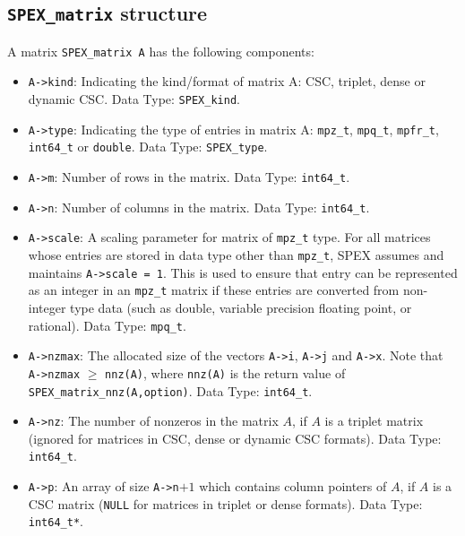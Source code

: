 \documentclass[12pt,oneside]{book}
\theoremstyle{definition}
\begin{document}
\subsection{\texttt{SPEX\_matrix} structure}
A matrix \verb|SPEX_matrix A| has the following components:

\begin{itemize}
    \item \verb|A->kind|: Indicating the kind/format of matrix A: CSC, triplet, dense or dynamic CSC. Data Type: \verb|SPEX_kind|.

    \item \verb|A->type|: Indicating the type of entries in matrix A: \verb|mpz_t|, \verb|mpq_t|, \verb|mpfr_t|, \verb|int64_t| or \verb|double|. Data Type: \verb|SPEX_type|.

    \item \verb|A->m|: Number of rows in the matrix. Data Type: \verb|int64_t|.

    \item \verb|A->n|: Number of columns in the matrix. Data Type: \verb|int64_t|.

    \item \verb|A->scale|: A scaling parameter for matrix of \verb|mpz_t| type. For all matrices whose entries are stored in data type other than \verb|mpz_t|, SPEX assumes and maintains \verb|A->scale = 1|. This is used to ensure that entry can be represented as an integer in an \verb|mpz_t| matrix if these entries are converted from non-integer type data (such as double, variable precision floating point, or rational). Data Type: \verb|mpq_t|.

    \item \verb|A->nzmax|: The allocated size of the vectors \verb|A->i|, \verb|A->j| and \verb|A->x|. Note that \verb|A->nzmax| $\geq$ \verb|nnz(A)|, where \verb|nnz(A)| is the return value of \verb|SPEX_matrix_nnz(A,option)|. Data Type: \verb|int64_t|.

    \item \verb|A->nz|: The number of nonzeros in the matrix $A$, if $A$ is a triplet matrix (ignored for matrices in CSC, dense or dynamic CSC formats). Data Type: \verb|int64_t|.

    \item \verb|A->p|: An array of size \verb|A->n|$+1$ which contains column pointers of $A$, if $A$ is a CSC matrix (\verb|NULL| for matrices in triplet or dense formats). Data Type: \verb|int64_t*|.


\end{itemize}
\end{document}
